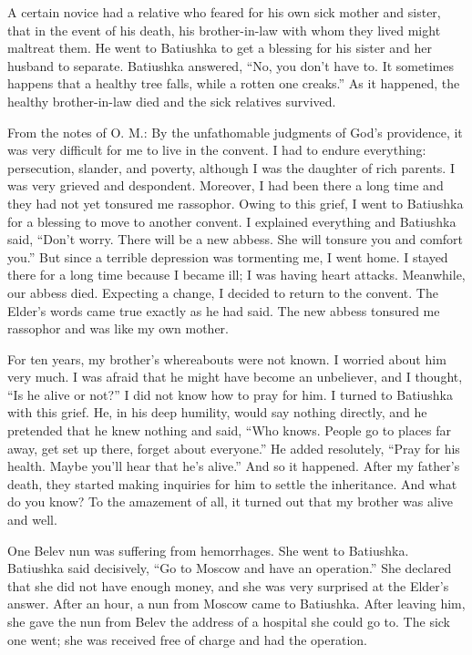 A certain novice had a relative who feared for his own sick mother and sister, that in the event of his death, his brother-in-law with whom they lived might maltreat them. He went to Batiushka to get a blessing for his sister and her husband to separate. Batiushka answered, ``No, you don't have to. It sometimes happens that a healthy tree falls, while a rotten one creaks.'' As it happened, the healthy brother-in-law died and the sick relatives survived.

 
\begin{longquote}{From the notes of O. M.:}
By the unfathomable judgments of God's providence, it was very difficult for me to live in the convent. I had to endure everything: persecution, slander, and poverty, although I was the daughter of rich parents. I was very grieved and despondent. Moreover, I had been there a long time and they had not yet tonsured me rassophor. Owing to this grief, I went to Batiushka for a blessing to move to another convent. I explained everything and Batiushka said, ``Don't worry. There will be a new abbess. She will tonsure you and comfort you.'' But since a terrible depression was tormenting me, I went home. I stayed there for a long time because I became ill; I was having heart attacks. Meanwhile, our abbess died. Expecting a change, I decided to return to the convent. The Elder's words came true exactly as he had said. The new abbess tonsured me rassophor and was like my own mother.

For ten years, my brother's whereabouts were not known. I worried about him very much. I was afraid that he might have become an unbeliever, and I thought, ``Is he alive or not?'' I did not know how to pray for him. I turned to Batiushka with this grief. He, in his deep humility, would say nothing directly, and he pretended that he knew nothing and said, ``Who knows. People go to places far away, get set up there, forget about everyone.'' He added resolutely, ``Pray for his health. Maybe you'll hear that he's alive.'' And so it happened. After my father's death, they started making inquiries for him to settle the inheritance. And what do you know? To the amazement of all, it turned out that my brother was alive and well.
\end{longquote}

One Belev nun was suffering from hemorrhages. She went to Batiushka. Batiushka said decisively, ``Go to Moscow and have an operation.'' She declared that she did not have enough money, and she was very surprised at the Elder's answer. After an hour, a nun from Moscow came to Batiushka. After leaving him, she gave the nun from Belev the address of a hospital she could go to. The sick one went; she was received free of charge and had the operation.

